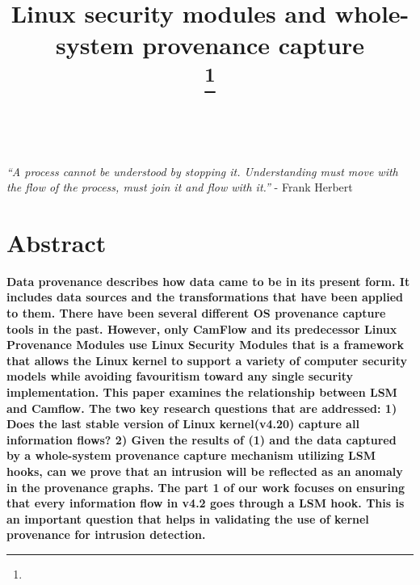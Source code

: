 \documentclass{IEEEtran}
\begin{document}
\title{Linux security modules and whole-system provenance capture\\
{\footnotesize}
\thanks{}
}

\author{ \\


}

\maketitle
 \textit{“A process cannot be understood by stopping it. Understanding must move with the flow of the process, must join it and flow with it.” } - Frank Herbert
\section*{Abstract}
    
     \vskip 0.2in
	 \textbf{Data provenance describes how data came to be in its present form. It includes data sources and the transformations that have been applied to them. There have been several different OS provenance capture tools in the past. However, only CamFlow and its predecessor Linux Provenance Modules use Linux Security Modules that is a  framework that allows the Linux kernel to support a variety of computer security models while avoiding favouritism toward any single security implementation. This paper examines the relationship between LSM and Camflow. The two key research questions that are addressed: 1) Does
	 the last stable version of Linux kernel(v4.20) capture all information flows? 2) Given the results of (1) and the data captured by a whole-system provenance capture mechanism utilizing LSM hooks, can we prove that an intrusion will be reflected as an anomaly in the provenance graphs. The part 1 of our work focuses on ensuring that every information flow  in v4.2 goes through a LSM hook. This is an important question that helps in validating the use of kernel provenance for intrusion detection. }










\end{document}
